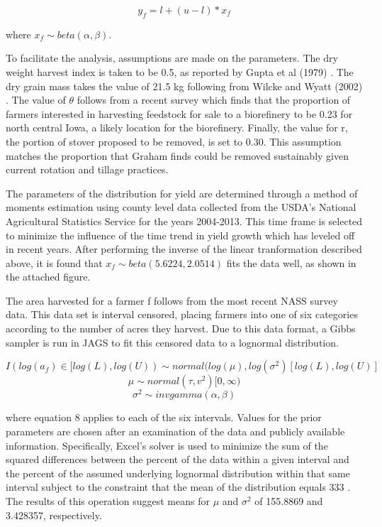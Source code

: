 \documentclass[12pt]{article}\usepackage[]{graphicx}\usepackage[]{color}
\begin{document}
\begin{equation}\tag{7}
y_f = l+(u-l)*x_f 
\end{equation}

where $x_f \sim beta(\alpha,\beta)$.

To facilitate the analysis, assumptions are made on the parameters.  The dry weight harvest index is taken to be 0.5, as reported by Gupta et al (1979) \cite{Gupta}.  The dry grain mass takes the value of 21.5 kg following from Wilcke and Wyatt (2002) \cite{Wilcke and Wyatt}.  The value of $\theta$ follows from a recent survey \cite{Tyndall} which finds that the proportion of farmers interested in harvesting feedstock for sale to a biorefinery to be 0.23 for north central Iowa, a likely location for the biorefinery.  Finally, the value for r, the portion of stover proposed to be removed, is set to 0.30.  This assumption matches the proportion that Graham finds could be removed sustainably given current rotation and tillage practices.

The parameters of the distribution for yield are determined through a method of moments estimation using county level data collected from the USDA's National Agricultural Statistics Service for the years 2004-2013.  This time frame is selected to minimize the influence of the time trend in yield growth which has leveled off in recent years.  After performing the inverse of the linear tranformation described above, it is found that $x_f \sim beta(5.6224,2.0514)$ fits the data well, as shown in the attached figure.

The area harvested for a farmer f follows from the most recent NASS survey data.  This data set is interval censored, placing farmers into one of six categories according to the number of acres they harvest.  Due to this data format, a Gibbs sampler is run in JAGS to fit this censored data to a lognormal distribution.

\begin{equation}\tag{8}
I(log(a_f) \in [log(L),log(U)) \sim normal(log(\mu),log(\sigma^2)[log(L),log(U)]
\end{equation}
\begin{equation}\tag{9}
\mu \sim normal(\tau,v^2)[0,\infty)
\end{equation}
\begin{equation}\tag{10}
\sigma^2 \sim invgamma(\alpha,\beta)
\end{equation}

where equation 8 applies to each of the six intervals.  Values for the prior parameters are chosen after an examination of the data and publicly available information.  Specifically, Excel's solver is used to minimize the sum of the squared differences between the percent of the data within a given interval and the percent of the assumed underlying lognormal distribution within that same interval subject to the constraint that the mean of the distribution equals 333 \cite{Iowa Quick Facts}.  The results of this operation suggest means for $\mu$ and $\sigma^2$ of 155.8869 and 3.428357, respectively.
\end{document}
